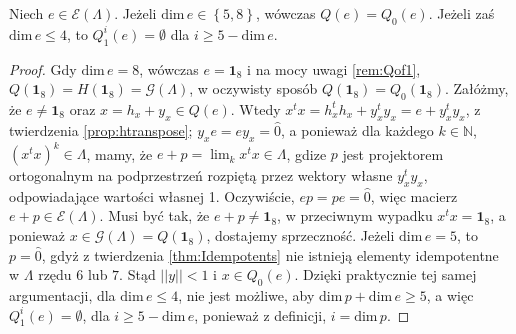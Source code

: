 \begin{Theorem}
Niech $e \in \mathcal{E}(\Lambda)$.
Jeżeli $\mathrm{dim} \, e \in \left \{ 5,8 \right \}$,
wówczas
$Q(e) = Q_{0}(e)$.
Jeżeli zaś $\mathrm{dim} \, e \leq 4$,
to
$Q_{1}^{i}(e) = \emptyset$ dla $i \geq 5 - \mathrm{dim} \, e$.
\end{Theorem}
\begin{proof}
    Gdy $\mathrm{dim} \, e = 8$,
    wówczas $e = \mathbf{1}_{8}$ i na mocy uwagi \ref{rem:Qof1},
    $Q(\mathbf{1}_{8}) = H(\mathbf{1}_{8}) = \mathcal{G}(\Lambda)$,
    w oczywisty sposób $Q(\mathbf{1}_{8}) = Q_{0}(\mathbf{1}_{8})$.
    Załóżmy, że $e \neq \mathbf{1}_{8}$
oraz $x = h_{x} + y_{x} \in Q(e)$.
Wtedy $x^{t} x = h_{x}^{t} h_{x} + y_{x}^{t} y_{x} = e + y_{x}^{t} y_{x}$,
z twierdzenia \ref{prop:htranspose};
    $y_{x} e = e y_{x} = \hat{0}$,
a ponieważ dla każdego $k \in \mathbb{N}$, $(x^{t} x)^{k} \in \Lambda$,
mamy, że $e + p = \lim_{k} x^{t} x \in \Lambda$,
gdize $p$ jest projektorem ortogonalnym na podprzestrzeń rozpiętą przez wektory
własne $y_{x}^{t} y_{x}$, odpowiadające wartości własnej 1.
Oczywiście, $e p = p e = \hat{0}$, więc
macierz $e + p \in \mathcal{E}(\Lambda)$.
Musi być tak, że $e + p \neq \mathbf{1}_{8}$,
w przeciwnym wypadku $x^{t} x = \mathbf{1}_{8}$, a ponieważ
    $x \in \mathcal{G}(\Lambda) = Q(\mathbf{1}_{8})$, dostajemy sprzeczność.
Jeżeli $\mathrm{dim}\,e = 5$, to $p = \hat{0}$,
gdyż z twierdzenia \ref{thm:Idempotents}
nie istnieją elementy idempotentne w  $\Lambda$
rzędu $6$ lub $7$.
Stąd $||y|| < 1$ i $x \in Q_{0}(e)$.
Dzięki praktycznie tej samej argumentacji, dla $\textrm{dim}\, e \leq 4$,
nie jest możliwe, aby $\mathrm{dim} \, p  + \mathrm{dim}\, e \geq 5$,
a więc $Q_{1}^{i}(e) = \emptyset$, dla $i \geq 5 - \mathrm{dim} \, e$,
ponieważ z definicji, $i = \textrm{dim}\,p$.
\end{proof}

